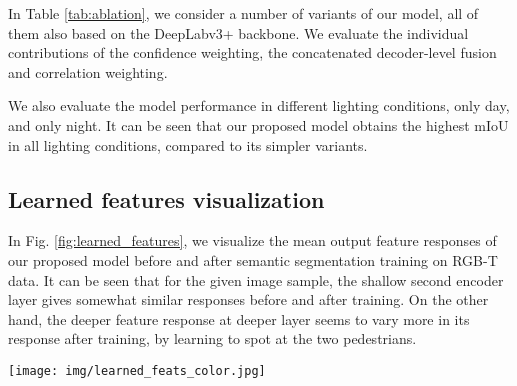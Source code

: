 \documentclass[10pt,twocolumn,letterpaper]{article}
\begin{document}
In Table \ref{tab:ablation}, we consider a number of variants of our model, all of them also based on the DeepLabv3+ backbone. We evaluate the individual contributions of the confidence weighting, the concatenated decoder-level fusion and correlation weighting. 

We also evaluate the model performance in different lighting conditions, only day, and only night. It can be seen that our proposed model obtains the highest mIoU in all lighting conditions, compared to its simpler variants.

\subsection{Learned features visualization}

In Fig. \ref{fig:learned_features}, we visualize the mean output feature responses of our proposed model before and after semantic segmentation training on RGB-T data. It can be seen that for the given image sample, the shallow second encoder layer gives somewhat similar responses before and after training. On the other hand, the deeper feature response at deeper layer seems to vary more in its response after training, by learning to spot at the two pedestrians.  

\begin{figure*}[t]
\texttt{[image: img/learned\_feats\_color.jpg]}
\centering
\caption{Illustration of features learned by color encoder (left two columns) and thermal encoder (right two columns) at encoder layer 2 and layer 4 (second and third rows) before (pretrained on Imagenet) and after training for semantic segmentation. Note that at the deeper level the feature responses seem less invariant to the imaging modality after training. }
\label{fig:learned_features}
\end{figure*}
\end{document}
